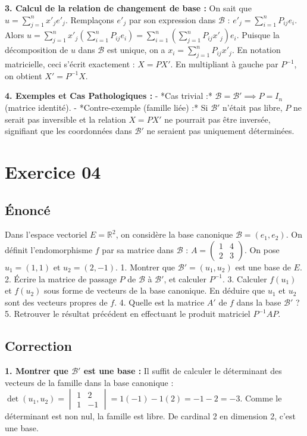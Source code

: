 \documentclass{report}
\begin{document}
\textbf{3. Calcul de la relation de changement de base :}
On sait que $u = \sum_{j=1}^n x'_j e'_j$.
Remplaçons $e'_j$ par son expression dans $\mathcal{B}$ : $e'_j = \sum_{i=1}^n P_{ij} e_i$.
Alors $u = \sum_{j=1}^n x'_j \left( \sum_{i=1}^n P_{ij} e_i \right) = \sum_{i=1}^n \left( \sum_{j=1}^n P_{ij} x'_j \right) e_i$.
Puisque la décomposition de $u$ dans $\mathcal{B}$ est unique, on a $x_i = \sum_{j=1}^n P_{ij} x'_j$.
En notation matricielle, ceci s'écrit exactement : $X = P X'$.
En multipliant à gauche par $P^{-1}$, on obtient $X' = P^{-1} X$.

\textbf{4. Exemples et Cas Pathologiques :}
- *Cas trivial :* $\mathcal{B} = \mathcal{B}' \implies P = I_n$ (matrice identité).
- *Contre-exemple (famille liée) :* Si $\mathcal{B}'$ n'était pas libre, $P$ ne serait pas inversible et la relation $X = P X'$ ne pourrait pas être inversée, signifiant que les coordonnées dans $\mathcal{B}'$ ne seraient pas uniquement déterminées.


\section*{Exercice 04}
\subsection*{Énoncé}
Dans l'espace vectoriel $E = \mathbb{R}^2$, on considère la base canonique $\mathcal{B} = (e_1, e_2)$.
On définit l'endomorphisme $f$ par sa matrice dans $\mathcal{B}$ :
$A = \begin{pmatrix} 1 & 4 \\ 2 & 3 \end{pmatrix}$.
On pose $u_1 = (1, 1)$ et $u_2 = (2, -1)$.
1. Montrer que $\mathcal{B}' = (u_1, u_2)$ est une base de $E$.
2. Écrire la matrice de passage $P$ de $\mathcal{B}$ à $\mathcal{B}'$, et calculer $P^{-1}$.
3. Calculer $f(u_1)$ et $f(u_2)$ sous forme de vecteurs de la base canonique. En déduire que $u_1$ et $u_2$ sont des vecteurs propres de $f$.
4. Quelle est la matrice $A'$ de $f$ dans la base $\mathcal{B}'$ ?
5. Retrouver le résultat précédent en effectuant le produit matriciel $P^{-1} A P$.

\subsection*{Correction}
\textbf{1. Montrer que $\mathcal{B}'$ est une base :}
Il suffit de calculer le déterminant des vecteurs de la famille dans la base canonique :
$\det(u_1, u_2) = \begin{vmatrix} 1 & 2 \\ 1 & -1 \end{vmatrix} = 1(-1) - 1(2) = -1 - 2 = -3$.
Comme le déterminant est non nul, la famille est libre. De cardinal 2 en dimension 2, c'est une base.
\end{document}
